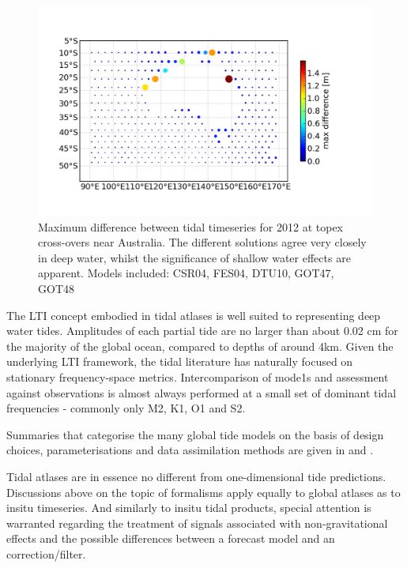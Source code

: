 \begin{figure}[h]
    \begin{center}
    \includegraphics[width=\figwidthBig]{figures/maps/map_tide_differences_tpx_xovers.png}
    \caption{Maximum difference between tidal timeseries for 2012 at topex cross-overs near Australia.  The different solutions agree very closely in deep water, whilst the significance of shallow water effects are apparent.  Models included: CSR04\citep{Eanes:1996tr}, FES04\citep{Lyard:2006ir}, DTU10\citep{IMPROVEMENTOFGLOBA:2010tu}, GOT47, GOT48\citep{Schrama:1994vr}\citep{Ray:1999vm} }
    \end{center}
    \label{fig:tpx_cross}
\end{figure}
The LTI concept embodied in tidal atlases is well suited to representing deep water tides.   Amplitudes of each partial tide are no larger than about 0.02 cm for the majority of the global ocean, compared to depths of around 4km.
Given the underlying LTI framework, the tidal literature has naturally focused on stationary frequency-space metrics.  Intercomparison of mode1s and assessment against observations is almost always performed at a small set of dominant tidal frequencies - commonly only M2, K1, O1 and S2.

Summaries that categorise the many global tide models on the basis of design choices, parameterisations and data assimilation methods are given in \cite{Ardalan:2008gs} and \cite{Matsumoto:2000tg}. 

Tidal atlases are in essence no different from one-dimensional tide predictions.    Discussions above on the topic of formalisms apply equally to global atlases as to insitu timeseries.  
And similarly to insitu tidal products, special attention is warranted regarding the treatment of signals associated with non-gravitational effects and the possible differences between a forecast model and an correction/filter.



